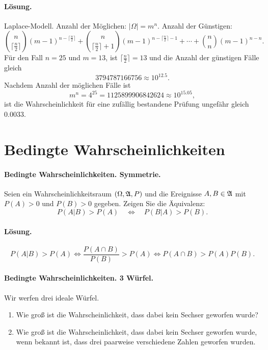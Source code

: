 \paragraph*{Lösung.} Laplace-Modell. Anzahl der Möglichen: $| \Omega| = m^n$. 
Anzahl der Günstigen:
\begin{equation*}
    \binom{n}{ \lceil\frac{n}{2}\rceil }(m-1)^{n - \lceil\frac{n}{2}\rceil } +
    \binom{n}{   \lceil\frac{n}{2}\rceil +1 }(m-1)^{n -   \lceil\frac{n}{2}\rceil-1   } + \cdots +
    \binom{n}{n} (m-1)^{n-n}. 
\end{equation*}
Für den Fall $n=25$ und $m=13$, ist $\lceil \frac{n}{2} \rceil = 13$ und die Anzahl 
der günstigen Fälle gleich 
\begin{equation}
    3794787166756 \approx 10^{12.5}.
\end{equation}
Nachdem Anzahl der möglichen Fälle ist 
\begin{equation}
    m^{n} = 4^{25} = 1125899906842624 \approx 10^{15.05},
\end{equation}
ist die Wahrscheinlichkeit für eine zufällig bestandene Prüfung ungefähr gleich
$0.0033$.




\section{Bedingte Wahrscheinlichkeiten}


\paragraph{Bedingte Wahrscheinlichkeiten. Symmetrie.}
Seien ein Wahrscheinlichkeitsraum $\left( \Omega, \mathfrak A, P \right)$ und die
Ereignisse $A,B\in \mathfrak A$ mit $P(A)>0$ und $P(B)>0$ gegeben.  Zeigen Sie die
Äquivalenz:
\begin{equation*}
    P(A | B ) > P(A) \quad \iff \quad P(B | A) > P(B).
\end{equation*}

\paragraph*{Lösung.}
\begin{equation*}
    P(A|B)>P(A) \iff \frac{ P(A \cap B) }{ P(B)} > P(A) \iff P(A \cap B) > P(A)P(B).
\end{equation*}


\paragraph{Bedingte Wahrscheinlichkeiten. 3 Würfel.} Wir werfen drei ideale Würfel. 
\begin{enumerate}
    \item Wie groß ist die Wahrscheinlichkeit, dass dabei kein Sechser geworfen wurde? 
    \item Wie groß ist die Wahrscheinlichkeit, dass dabei kein Sechser geworfen wurde, wenn
        bekannt ist, dass drei paarweise verschiedene Zahlen geworfen wurden. 
\end{enumerate}

